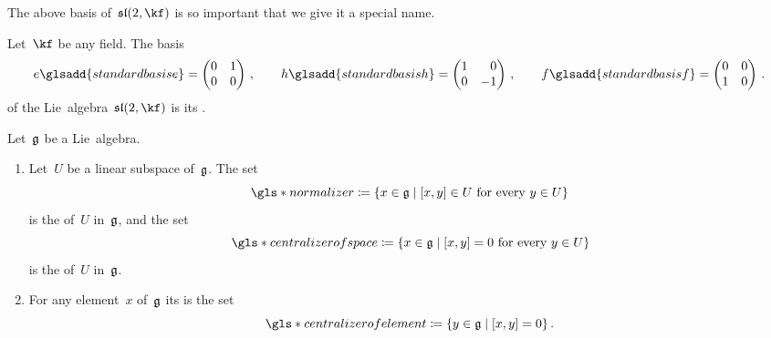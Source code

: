 \begin{fluff}
  The above basis of~$\sllie(2, \kf)$ is so important that we give it a special name.
\end{fluff}


\begin{definition}
 Let~$\kf$ be any field.
 The basis
 \[
    e\glsadd{standard basis e}
    =
    \begin{pmatrix}
      0 & 1 \\
      0 & 0
    \end{pmatrix} \,,
    \qquad
    h\glsadd{standard basis h}
    =
    \begin{pmatrix*}[r]
      1 &  0  \\
      0 & -1
    \end{pmatrix*}  \,,
    \qquad
    f\glsadd{standard basis f}
    =
    \begin{pmatrix}
      0 & 0 \\
      1 & 0
    \end{pmatrix} \,.
  \]
  of the Lie~algebra~$\sllie(2, \kf)$ is its .
\end{definition}


\begin{definition}
  Let~$\mathfrak{g}$ be a Lie~algebra.
  \begin{enumerate}
    \item
      Let~$U$ be a linear subspace of~$\mathfrak{g}$.
      The set
      \[
        \gls*{normalizer}
        \defined
        \{
          x \in \glie
        \suchthat
          \text{$[x,y] \in U$ for every~$y \in U$}
        \}
      \]
      is the  of~$U$ in~$\mathfrak{g}$, and the set
      \[
        \gls*{centralizer of space}
        \defined
        \{
          x \in \glie
        \suchthat
          \text{$[x,y] = 0$ for every~$y \in U$}
        \}
      \]
      is the  of~$U$ in~$\mathfrak{g}$.
    \item
      For any element~$x$ of~$\mathfrak{g}$ its  is the set
      \[
        \gls*{centralizer of element}
        \defined
        \{
          y \in \glie
        \suchthat
          {}
          [x,y] = 0
        \} \,.
      \]
  \end{enumerate}
\end{definition}


